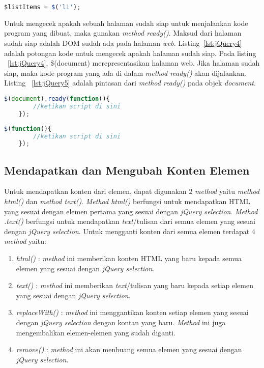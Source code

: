 \begin{lstlisting}[language=Javascript, caption=Menyimpan objek jQuery , label={lst:jQuery3}]
	$listItems = $('li');
\end{lstlisting}

Untuk mengecek apakah sebuah halaman sudah siap untuk menjalankan kode program yang dibuat, maka gunakan \textit{method ready()}. Maksud dari halaman sudah siap adalah DOM sudah ada pada halaman \textit{web}. Listing~\ref{lst:jQuery4} adalah potongan kode untuk mengecek apakah halaman sudah siap. Pada listing ~\ref{lst:jQuery4}, \$(document) merepresentasikan halaman web. Jika halaman sudah siap, maka kode program yang ada di dalam \textit{method ready()} akan dijalankan. Listing ~\ref{lst:jQuery5} adalah pintasan dari \textit{method ready()} pada objek \textit{document}.

\begin{lstlisting}[language=Javascript, caption=Mengecek apakah halaman sudah siap , label={lst:jQuery4}]
	$(document).ready(function(){
		//ketikan script di sini
	});
\end{lstlisting}

\begin{lstlisting}[language=Javascript, caption=Pintasan dari method \$(document).ready() , label={lst:jQuery5}]
	$(function(){
		//ketikan script di sini
	});
\end{lstlisting}

\subsection{Mendapatkan dan Mengubah Konten Elemen}
Untuk mendapatkan konten dari elemen, dapat digunakan 2 \textit{method} yaitu \textit{method html()} dan \textit{method text()}. \textit{Method html()} berfungsi untuk mendapatkan HTML yang sesuai dengan elemen pertama yang sesuai dengan \textit{jQuery selection}. \textit{Method .text()} berfungsi untuk mendapatkan \textit{text}/tulisan dari semua elemen yang sesuai dengan \textit{jQuery selection}. Untuk mengganti konten dari semua elemen terdapat 4 \textit{method} yaitu:

\begin{enumerate}
	\item \textit{html()} : \textit{method} ini memberikan konten HTML yang baru kepada semua elemen yang sesuai dengan \textit{jQuery selection}.
	\item \textit{text()} : \textit{method} ini memberikan \textit{text}/tulisan yang baru kepada setiap elemen yang sesuai dengan \textit{jQuery selection}.
	\item \textit{replaceWith()} : \textit{method} ini menggantikan konten setiap elemen yang sesuai dengan \textit{jQuery selection} dengan kontan yang baru. \textit{Method} ini juga mengembalikan elemen-elemen yang sudah diganti.
	\item \textit{remove()} : \textit{method} ini akan menbuang semua elemen yang sesuai dengan \textit{jQuery selection}.
\end{enumerate}

